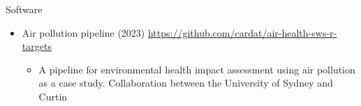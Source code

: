 \begin{rSection}{Software}
\begin{itemize}
 \item{Air pollution pipeline (2023)} \url{https://github.com/cardat/air-health-sws-r-targets}
 \begin{itemize}
 	\item{A pipeline for environmental health impact assessment using air pollution as a case study. Collaboration between the University of Sydney and Curtin}
 \end{itemize}
 
 \end{itemize}

\end{rSection}
